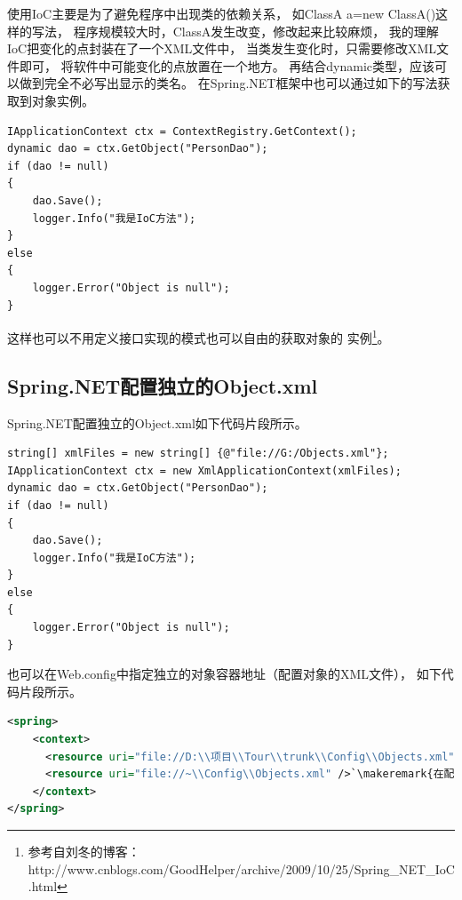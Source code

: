 \documentclass{book}
\newcounter{coderemarks}   %
\newcommand{\circlemark}[1]{%
\tikz\node[text=white,font=\sffamily\bfseries,inner sep=0.2mm,draw,circle,fill=black]{#1};}
\newcommand{\makeremark}[1]{%
\circlemark{\arabic{coderemarks}}%
\global \expandafter\def \csname codebox\the\value{coderemarks}\endcsname{#1}%
\stepcounter{coderemarks}}
\begin{document}
使用IoC主要是为了避免程序中出现类的依赖关系，
如ClassA a=new ClassA()这样的写法，
程序规模较大时，ClassA发生改变，修改起来比较麻烦，
我的理解IoC把变化的点封装在了一个XML文件中，
当类发生变化时，只需要修改XML文件即可，
将软件中可能变化的点放置在一个地方。
再结合dynamic类型，应该可以做到完全不必写出显示的类名。
在Spring.NET框架中也可以通过如下的写法获取到对象实例。

\begin{lstlisting}[language={[Sharp]C}]
IApplicationContext ctx = ContextRegistry.GetContext();
dynamic dao = ctx.GetObject("PersonDao");
if (dao != null)
{   
    dao.Save();
    logger.Info("我是IoC方法");
}
else
{
    logger.Error("Object is null");
}
\end{lstlisting}

这样也可以不用定义接口实现的模式也可以自由的获取对象的
实例\footnote{参考自刘冬的博客：http://www.cnblogs.com/GoodHelper/archive/2009/10/25/Spring\_NET\_IoC.html}。

\subsection{Spring.NET配置独立的Object.xml}

Spring.NET配置独立的Object.xml如下代码片段所示。

\begin{lstlisting}[language={[Sharp]C}]
string[] xmlFiles = new string[] {@"file://G:/Objects.xml"};
IApplicationContext ctx = new XmlApplicationContext(xmlFiles);
dynamic dao = ctx.GetObject("PersonDao");
if (dao != null)
{
    dao.Save();
    logger.Info("我是IoC方法");
}
else
{
    logger.Error("Object is null");
}
\end{lstlisting}

也可以在Web.config中指定独立的对象容器地址（配置对象的XML文件），
如下代码片段所示。

\begin{lstlisting}[language=XML]
<spring>
	<context>
	  <resource uri="file://D:\\项目\\Tour\\trunk\\Config\\Objects.xml" />`\makeremark{在配置文件中以绝对路径的方式指定Objects.xml文件的位置}`
	  <resource uri="file://~\\Config\\Objects.xml" />`\makeremark{在配置文件中以相对路径的方式指定Objects.xml文件的位置，在NUnit单元测试中，相对路径为NUnit项目文件的存放路径}`
	</context>    
</spring>
\end{lstlisting}
\end{document}
